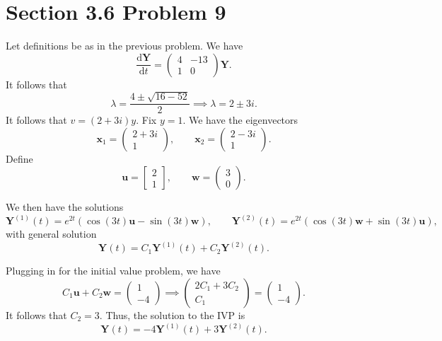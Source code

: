 \documentclass[11pt, letterpaper]{report}
\begin{document}
\section*{Section 3.6 Problem 9}
Let definitions be as in the previous problem. We have
\[
	\frac{\mathrm{d}\mathbf{Y}}{\mathrm{d}t} =\begin{pmatrix}
		4&-13\\
		1&0
	\end{pmatrix} \mathbf{Y}
.\]
It follows that
\[
	\lambda =\frac{4\pm \sqrt{16-52} }{2}\implies \lambda =2\pm 3i
.\]
It follows that $v=(2+3i)y$. Fix $y=1$. We have the eigenvectors
\[
	\mathbf{x}_1=\begin{pmatrix}
		2+3i\\
		1
	\end{pmatrix} ,\qquad \mathbf{x}_2 = \begin{pmatrix}
		2-3i\\
		1
	\end{pmatrix} 
.\]
Define
\[
	\mathbf{u}=\begin{bmatrix}
		2\\
		1
	\end{bmatrix} ,\qquad \mathbf{w}=\begin{pmatrix}
		3\\
		0
	\end{pmatrix} 
.\]

We then have the solutions
\[
	\mathbf{Y}^{(1)}(t)=e^{2t}\left( \cos (3t)\mathbf{u}-\sin (3t)\mathbf{w} \right) ,\qquad \mathbf{Y}^{(2)}(t)=e^{2t}\left( \cos (3t)\mathbf{w}+\sin (3t)\mathbf{u} \right) 
,\]
with general solution
\[
	\mathbf{Y}(t)=C_1\mathbf{Y}^{(1)}(t)+C_2 \mathbf{Y}^{(2)}(t)
.\]

Plugging in for the initial value problem, we have
\[
	C_1 \mathbf{u}+C_2 \mathbf{w}=\begin{pmatrix}
		1\\
		-4
	\end{pmatrix} \implies \begin{pmatrix}
		2C_1 + 3C_2\\
		C_1
	\end{pmatrix} =\begin{pmatrix}
		1\\
		-4
	\end{pmatrix} 
.\]
It follows that $C_2 = 3$. Thus, the solution to the IVP is
\[
	\mathbf{Y}(t)=-4 \mathbf{Y}^{(1)}(t)+3\mathbf{Y}^{(2)}(t)
.\]
\end{document}
